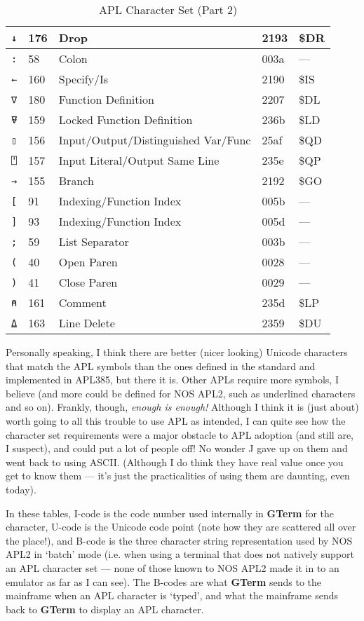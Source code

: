 \documentclass[a4paper,twoside,11pt]{article}
\newcommand{\newpara}{\par\vspace{4mm}\noindent}
\begin{document}
\begin{table}
\begin{tabular}{||l|l|l|l|l||}
\texttt{↓} & 176 & Drop & 2193 & \$DR\\\hline
\texttt{:} & 58 & Colon & 003a & ---\\\hline
\texttt{←} & 160 & Specify/Is & 2190 & \$IS\\\hline
\texttt{∇} & 180 & Function Definition & 2207 & \$DL\\\hline
\texttt{⍫} & 159 & Locked Function Definition & 236b & \$LD\\\hline
\texttt{▯} & 156 & Input/Output/Distinguished Var/Func & 25af & \$QD\\\hline
\texttt{⍞} & 157 & Input Literal/Output Same Line & 235e & \$QP\\\hline
\texttt{→} & 155 & Branch & 2192 & \$GO\\\hline
\texttt{{[}} & 91 & Indexing/Function Index & 005b & ---\\\hline
\texttt{{]}} & 93 & Indexing/Function Index & 005d & ---\\\hline
\texttt{;} & 59 & List Separator & 003b & ---\\\hline
\texttt{(} & 40 & Open Paren & 0028 & ---\\\hline
\texttt{)} & 41 & Close Paren & 0029 & ---\\\hline
\texttt{⍝} & 161 & Comment & 235d & \$LP\\\hline
\texttt{⍙} & 163 & Line Delete & 2359 & \$DU\\\hline
\hline\hline
\end{tabular}
\caption{APL Character Set (Part 2)}
\label{tab:aplcs2}
\end{table}

\newpara
Personally speaking, I think there are better (nicer looking) Unicode characters that match the APL symbols than the
ones defined in the standard and implemented in APL385, but there it is. Other APLs require more symbols, I
believe (and more could be defined for NOS APL2, such as underlined characters and so on). Frankly, though,
\textit{enough is enough!} Although I think it is (just about) worth going to all this trouble to use APL as intended, 
I can quite
see how the character set requirements were 
a major obstacle to APL adoption (and still are, I suspect), and could put a lot of people off!
No wonder J gave up on them and went back to using ASCII. (Although I do think they have real
value once you get to know them --- it's just
the practicalities of using them are daunting, even today).
\newpara
In these tables, I-code is the code number used internally in \textbf{GTerm} for the character,
U-code is the Unicode code point (note how they are scattered all over the place!),
and B-code is the three character string representation used by NOS APL2 in `batch'
mode (i.e. when using a terminal that does not natively support an APL character set ---
none of those known to NOS APL2 made it in to an emulator as far as I can see). The
B-codes are what \textbf{GTerm} sends to the mainframe when an APL character is `typed', and what the
mainframe sends back to \textbf{GTerm} to display an APL character.
\end{document}
